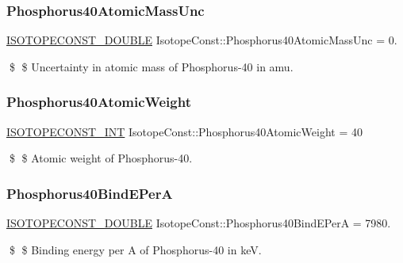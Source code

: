 \subsubsection{\texorpdfstring{Phosphorus40\+Atomic\+Mass\+Unc}{Phosphorus40AtomicMassUnc}}
{\footnotesize\ttfamily \mbox{\hyperlink{group___isotope_const-_macros_ga8f45a7272ce02c0b4c65c44636ed719a}{I\+S\+O\+T\+O\+P\+E\+C\+O\+N\+S\+T\+\_\+\+D\+O\+U\+B\+LE}} Isotope\+Const\+::\+Phosphorus40\+Atomic\+Mass\+Unc = 0.}

\$ \$ Uncertainty in atomic mass of Phosphorus-\/40 in amu. \mbox{\label{group___isotope_const-_phosphorus-_p40_gac5cd39290bff9743e2109fac45313dd2}} 
\subsubsection{\texorpdfstring{Phosphorus40\+Atomic\+Weight}{Phosphorus40AtomicWeight}}
{\footnotesize\ttfamily \mbox{\hyperlink{group___isotope_const-_macros_ga5f18360b3e99483a35c32d789e62621c}{I\+S\+O\+T\+O\+P\+E\+C\+O\+N\+S\+T\+\_\+\+I\+NT}} Isotope\+Const\+::\+Phosphorus40\+Atomic\+Weight = 40}

\$ \$ Atomic weight of Phosphorus-\/40. \mbox{\label{group___isotope_const-_phosphorus-_p40_ga6407772c6f5e571ee35b2f08c4425296}} 
\subsubsection{\texorpdfstring{Phosphorus40\+Bind\+E\+PerA}{Phosphorus40BindEPerA}}
{\footnotesize\ttfamily \mbox{\hyperlink{group___isotope_const-_macros_ga8f45a7272ce02c0b4c65c44636ed719a}{I\+S\+O\+T\+O\+P\+E\+C\+O\+N\+S\+T\+\_\+\+D\+O\+U\+B\+LE}} Isotope\+Const\+::\+Phosphorus40\+Bind\+E\+PerA = 7980.}

\$ \$ Binding energy per A of Phosphorus-\/40 in keV. \mbox{\label{group___isotope_const-_phosphorus-_p40_gab1f54602fbab81393876c9422099aa9a}} 

